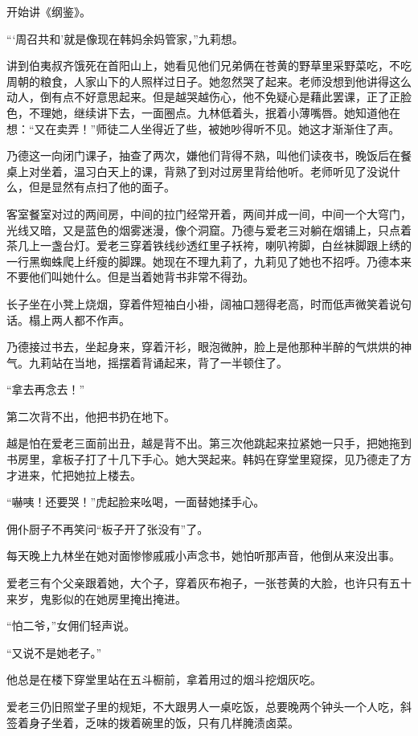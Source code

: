 \par 开始讲《纲鉴》。
\par “‘周召共和’就是像现在韩妈余妈管家，”九莉想。
\par 讲到伯夷叔齐饿死在首阳山上，她看见他们兄弟俩在苍黄的野草里采野菜吃，不吃周朝的粮食，人家山下的人照样过日子。她忽然哭了起来。老师没想到他讲得这么动人，倒有点不好意思起来。但是越哭越伤心，他不免疑心是藉此罢课，正了正脸色，不理她，继续讲下去，一面圈点。九林低着头，抿着小薄嘴唇。她知道他在想：“又在卖弄！”师徒二人坐得近了些，被她吵得听不见。她这才渐渐住了声。
\par 乃德这一向闭门课子，抽查了两次，嫌他们背得不熟，叫他们读夜书，晚饭后在餐桌上对坐着，温习白天上的课，背熟了到对过房里背给他听。老师听见了没说什么，但是显然有点扫了他的面子。
\par 客室餐室对过的两间房，中间的拉门经常开着，两间并成一间，中间一个大穹门，光线又暗，又是蓝色的烟雾迷漫，像个洞窟。乃德与爱老三对躺在烟铺上，只点着茶几上一盏台灯。爱老三穿着铁线纱透红里子袄袴，喇叭袴脚，白丝袜脚跟上绣的一行黑蜘蛛爬上纤瘦的脚踝。她现在不理九莉了，九莉见了她也不招呼。乃德本来不要他们叫她什么。但是当着她背书非常不得劲。
\par 长子坐在小凳上烧烟，穿着件短袖白小褂，阔袖口翘得老高，时而低声微笑着说句话。榻上两人都不作声。
\par 乃德接过书去，坐起身来，穿着汗衫，眼泡微肿，脸上是他那种半醉的气烘烘的神气。九莉站在当地，摇摆着背诵起来，背了一半顿住了。
\par “拿去再念去！”
\par 第二次背不出，他把书扔在地下。
\par 越是怕在爱老三面前出丑，越是背不出。第三次他跳起来拉紧她一只手，把她拖到书房里，拿板子打了十几下手心。她大哭起来。韩妈在穿堂里窥探，见乃德走了方才进来，忙把她拉上楼去。
\par “嚇咦！还要哭！”虎起脸来吆喝，一面替她揉手心。
\par 佣仆厨子不再笑问“板子开了张没有”了。
\par 每天晚上九林坐在她对面惨惨戚戚小声念书，她怕听那声音，他倒从来没出事。
\par 爱老三有个父亲跟着她，大个子，穿着灰布袍子，一张苍黄的大脸，也许只有五十来岁，鬼影似的在她房里掩出掩进。
\par “怕二爷，”女佣们轻声说。
\par “又说不是她老子。”
\par 他总是在楼下穿堂里站在五斗橱前，拿着用过的烟斗挖烟灰吃。
\par 爱老三仍旧照堂子里的规矩，不大跟男人一桌吃饭，总要晚两个钟头一个人吃，斜签着身子坐着，乏味的拨着碗里的饭，只有几样腌渍卤菜。
